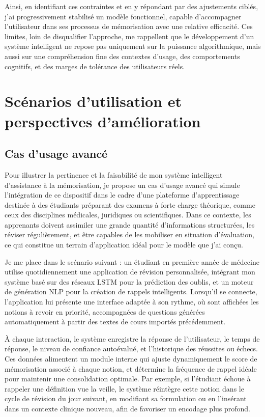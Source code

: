 \documentclass[11pt,a4paper]{report}
\begin{document}
Ainsi, en identifiant ces contraintes et en y répondant par des ajustements ciblés, j’ai progressivement stabilisé un modèle fonctionnel, capable d’accompagner l’utilisateur dans ses processus de mémorisation avec une relative efficacité. Ces limites, loin de disqualifier l’approche, me rappellent que le développement d’un système intelligent ne repose pas uniquement sur la puissance algorithmique, mais aussi sur une compréhension fine des contextes d’usage, des comportements cognitifs, et des marges de tolérance des utilisateurs réels.

\section{Scénarios d’utilisation et perspectives d’amélioration}

\subsection{Cas d’usage avancé}

Pour illustrer la pertinence et la faisabilité de mon système intelligent d’assistance à la mémorisation, je propose un cas d’usage avancé qui simule l’intégration de ce dispositif dans le cadre d’une plateforme d’apprentissage destinée à des étudiants préparant des examens à forte charge théorique, comme ceux des disciplines médicales, juridiques ou scientifiques. Dans ce contexte, les apprenants doivent assimiler une grande quantité d’informations structurées, les réviser régulièrement, et être capables de les mobiliser en situation d’évaluation, ce qui constitue un terrain d’application idéal pour le modèle que j’ai conçu.

Je me place dans le scénario suivant : un étudiant en première année de médecine utilise quotidiennement une application de révision personnalisée, intégrant mon système basé sur des réseaux LSTM pour la prédiction des oublis, et un moteur de génération NLP pour la création de rappels intelligents. Lorsqu’il se connecte, l’application lui présente une interface adaptée à son rythme, où sont affichées les notions à revoir en priorité, accompagnées de questions générées automatiquement à partir des textes de cours importés précédemment.

À chaque interaction, le système enregistre la réponse de l’utilisateur, le temps de réponse, le niveau de confiance autoévalué, et l’historique des réussites ou échecs. Ces données alimentent un module interne qui ajuste dynamiquement le score de mémorisation associé à chaque notion, et détermine la fréquence de rappel idéale pour maintenir une consolidation optimale. Par exemple, si l’étudiant échoue à rappeler une définition vue la veille, le système réintègre cette notion dans le cycle de révision du jour suivant, en modifiant sa formulation ou en l’insérant dans un contexte clinique nouveau, afin de favoriser un encodage plus profond.
\end{document}

